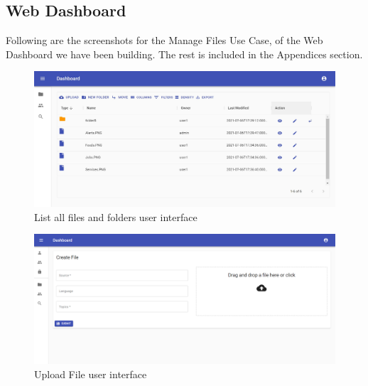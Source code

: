 \subsection{Web Dashboard}
Following are the screenshots for the Manage Files Use Case, of the Web Dashboard we have been building. The rest is included in the Appendices section. 
\begin{figure}[H]
    \centering
    \includegraphics[width=1.0\textwidth]{images/Directory-Listing.jpg}
    \caption{List all files and folders user interface}
    \label{fig:listContent}
\end{figure}
\begin{figure}[H]
    \centering
    \includegraphics[width=1.0\textwidth]{images/File-Upload.png}
    \caption{Upload File user interface}
    \label{fig:uploadFile}
\end{figure}
